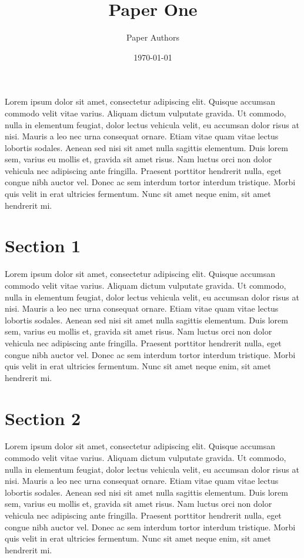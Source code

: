 \documentclass[12pt,letterpaper]{article}
\title{Paper One}
\date{\today}
\author{Paper Authors}
\begin{document}
\maketitle
\tableofcontents

Lorem ipsum dolor sit amet, consectetur adipiscing elit. Quisque accumsan commodo velit vitae varius. Aliquam dictum
vulputate gravida. Ut commodo, nulla in elementum feugiat, dolor lectus vehicula velit, eu accumsan dolor risus at nisi.
Mauris a leo nec urna consequat ornare. Etiam vitae quam vitae lectus lobortis sodales. Aenean sed nisi sit amet nulla
sagittis elementum. Duis lorem sem, varius eu mollis et, gravida sit amet risus. Nam luctus orci non dolor vehicula nec
adipiscing ante fringilla. Praesent porttitor hendrerit nulla, eget congue nibh auctor vel. Donec ac sem interdum tortor
interdum tristique. Morbi quis velit in erat ultricies fermentum. Nunc sit amet neque enim, sit amet hendrerit mi.

\section{Section 1}
Lorem ipsum dolor sit amet, consectetur adipiscing elit. Quisque accumsan commodo velit vitae varius. Aliquam dictum
vulputate gravida. Ut commodo, nulla in elementum feugiat, dolor lectus vehicula velit, eu accumsan dolor risus at nisi.
Mauris a leo nec urna consequat ornare. Etiam vitae quam vitae lectus lobortis sodales. Aenean sed nisi sit amet nulla
sagittis elementum. Duis lorem sem, varius eu mollis et, gravida sit amet risus. Nam luctus orci non dolor vehicula nec
adipiscing ante fringilla. Praesent porttitor hendrerit nulla, eget congue nibh auctor vel. Donec ac sem interdum tortor
interdum tristique. Morbi quis velit in erat ultricies fermentum. Nunc sit amet neque enim, sit amet hendrerit mi.

\section{Section 2}
Lorem ipsum dolor sit amet, consectetur adipiscing elit. Quisque accumsan commodo velit vitae varius. Aliquam dictum
vulputate gravida. Ut commodo, nulla in elementum feugiat, dolor lectus vehicula velit, eu accumsan dolor risus at nisi.
Mauris a leo nec urna consequat ornare. Etiam vitae quam vitae lectus lobortis sodales. Aenean sed nisi sit amet nulla
sagittis elementum. Duis lorem sem, varius eu mollis et, gravida sit amet risus. Nam luctus orci non dolor vehicula nec
adipiscing ante fringilla. Praesent porttitor hendrerit nulla, eget congue nibh auctor vel. Donec ac sem interdum tortor
interdum tristique. Morbi quis velit in erat ultricies fermentum. Nunc sit amet neque enim, sit amet hendrerit mi.
\end{document}
